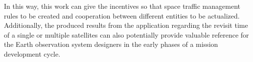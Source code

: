 In this way, this work can give the incentives so that space traffic management rules to be created and cooperation between different entities to be actualized. Additionally, the produced results from the application regarding the revisit time of a single or multiple satellites can also potentially provide valuable reference for the Earth observation system designers in the early phases of a mission development cycle.


